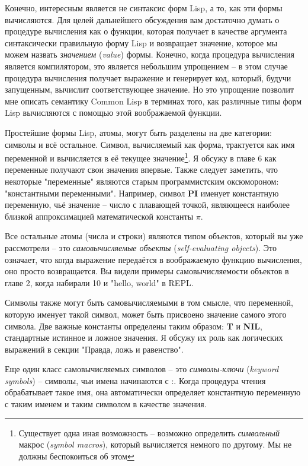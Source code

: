 Конечно, интересным является не синтаксис форм Lisp, а то, как эти формы вычисляются. Для
целей дальнейшего обсуждения вам достаточно думать о процедуре вычисления как о функции,
которая получает в качестве аргумента синтаксически правильную форму Lisp и возвращает
значение, которое мы можем назвать \textit{значением} (\textit{value}) формы. Конечно,
когда процедура вычисления является компилятором, это является небольшим упрощением -- в
этом случае процедура вычисления получает выражение и генерирует код, который, будучи
запущенным, вычислит соответствующее значение. Но это упрощение позволит мне описать
семантику Common Lisp в терминах того, как различные типы форм Lisp вычисляются с помощью
этой воображаемой функции.

Простейшие формы Lisp, атомы, могут быть разделены на две категории: символы и всё
остальное. Символ, вычисляемый как форма, трактуется как имя переменной и вычисляется в её
текущее значение\footnote{Существует одна иная возможность -- возможно определить
  \textit{символьный} макрос (\textit{symbol macros}), который вычисляется немного по
  другому. Мы не должны беспокоиться об этом}. Я обсужу в главе 6 как переменные получают
свои значения впервые. Также следует заметить, что некоторые "переменные" являются старым
программистским оксюмороном: "константными переменными". Например, символ \textbf{PI}
именует константную переменную, чьё значение -- число с плавающей точкой, являющееся
наиболее близкой аппроксимацией математической константы $\pi$.

Все остальные атомы (числа и строки) являются типом объектов, который вы уже рассмотрели
-- это \textit{самовычисляемые объекты} (\textit{self-evaluating objects}). Это означает,
что когда выражение передаётся в воображаемую функцию вычисления, оно просто
возвращается. Вы видели примеры самовычисляемости объектов в главе 2, когда набирали 10 и
"hello, world" в REPL.

Символы также могут быть самовычисляемыми в том смысле, что переменной, которую именует
такой символ, может быть присвоено значение самого этого символа. Две важные константы
определены таким образом: \textbf{T} и \textbf{NIL}, стандартные истинное и ложное
значения. Я обсужу их роль как логических выражений в секции "Правда, ложь и равенство".

Еще один класс самовычисляемых символов -- это \textit{символы-ключи} (\textit{keyword
  symbols}) -- символы, чьи имена начинаются с :. Когда процедура чтения обрабатывает
такое имя, она автоматически определяет константную переменную с таким именем и таким
символом в качестве значения.

